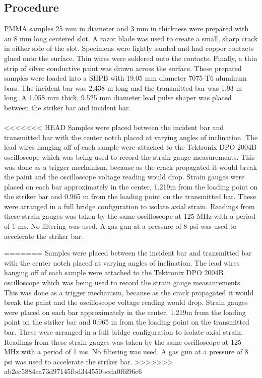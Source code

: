 \documentclass[12pt]{article}
\begin{document}
\subsection{Procedure} %
PMMA samples 25 mm in diameter and 3 mm in thickness were prepared with an 8 mm long centered slot. A razor blade was used to create a small, sharp crack in either side of the slot. Specimens were lightly sanded and had copper contacts glued onto the surface. Thin wires were soldered onto the contacts. Finally, a thin strip of silver conductive paint was drawn across the surface. These prepared samples were loaded into a SHPB with 19.05 mm diameter 7075-T6 aluminum bars. The incident bar was 2.438 m long and the transmitted bar was 1.93 m long. A 1.058 mm thick, 9.525 mm diameter lead pulse shaper was placed between the striker bar and incident bar.
\\ \\
<<<<<<< HEAD
Samples were placed between the incident bar and transmitted bar with the center notch placed at varying angles of inclination. The lead wires hanging off of each sample were attached to the Tektronix DPO 2004B oscilloscope which was being used to record the strain gauge measurements. This was done as a trigger mechanism, because as the crack propagated it would break the paint and the oscilloscope voltage reading would drop. Strain gauges were placed on each bar approximately in the center, 1.219m from the loading point on the striker bar and 0.965 m from the loading point on the transmitted bar. These were arranged in a full bridge configuration to isolate axial strain. Readings from these strain gauges was taken by the same oscilloscope at 125 MHz with a period of 1 ms. No filtering was used. A gas gun at a pressure of 8 psi was used to accelerate the striker bar.

=======
Samples were placed between the incident bar and transmitted bar with the center notch placed at varying angles of inclination. The lead wires hanging off of each sample were attached to the Tektronix DPO 2004B oscilloscope which was being used to record the strain gauge measaurements. This was done as a trigger mechanism, because as the crack propagated it would break the paint and the oscilloscope voltage reading would drop. Strain gauges were placed on each bar approximately in the center, 1.219m from the loading point on the striker bar and 0.965 m from the loading point on the transmitted bar. These were arranged in a full bridge configuration to isolate axial strain. Readings from these strain gauges was taken by the same oscilloscope at 125 MHz with a period of 1 ms. No filtering was used. A gas gun at a pressure of 8 psi was used to accelerate the striker bar.
>>>>>>> ab2ec5884ea73d97145fbd344550bcda0f6f96c6
\end{document}
